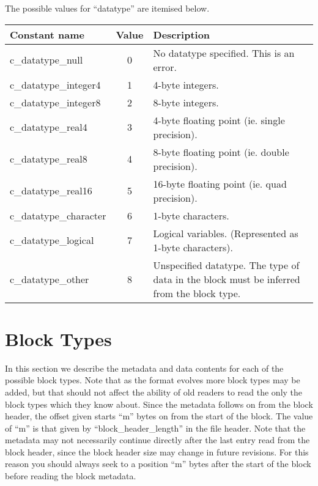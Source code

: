 \documentclass[12pt]{article}
\begin{document}
The possible values for ``datatype'' are itemised below.\\

\begin{center}
\begin{tabularx}{0.9\textwidth}[!hbt]{lcX}
  Constant name & Value & Description
  \\\toprule

  c\_datatype\_null & 0 & No datatype specified. This is an error.
  \\\midrule

  c\_datatype\_integer4 & 1 & 4-byte integers.
  \\\midrule

  c\_datatype\_integer8 & 2 & 8-byte integers.
  \\\midrule

  c\_datatype\_real4 & 3 & 4-byte floating point (ie. single precision).
  \\\midrule

  c\_datatype\_real8 & 4 & 8-byte floating point (ie. double precision).
  \\\midrule

  c\_datatype\_real16 & 5 & 16-byte floating point (ie. quad precision).
  \\\midrule

  c\_datatype\_character & 6 & 1-byte characters.
  \\\midrule

  c\_datatype\_logical & 7 & Logical variables. (Represented as 1-byte
  characters).
  \\\midrule

  c\_datatype\_other & 8 & Unspecified datatype. The type of data in the block
  must be inferred from the block type.
\end{tabularx}
\end{center}\vspace{10pt}

\section{Block Types}

In this section we describe the metadata and data contents for each of
the possible block types. Note that as the format evolves more block types
may be added, but that should not affect the ability of old readers to
read the only the block types which they know about.
Since the metadata follows on from the block header, the offset given
starts ``m'' bytes on from the start of the block. The value of ``m''
is that given by ``block\_header\_length'' in the file header. Note that
the metadata may not necessarily continue directly after the last entry
read from the block header, since the block header size may change in
future revisions. For this reason you should always seek to a position
``m'' bytes after the start of the block before reading the block metadata.
\end{document}
